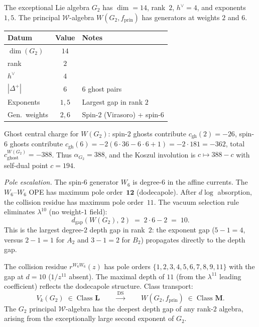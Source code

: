 \begin{computation}
\label{comp:wG2-ds-data}
%
%
The exceptional Lie algebra $G_2$ has $\dim = 14$, rank~$2$,
$h^\vee = 4$, and exponents $1, 5$. The principal
$\mathcal{W}$-algebra $W(G_2, f_{\mathrm{prin}})$ has
generators at weights $2$ and $6$.

\begin{center}
\small
\renewcommand{\arraystretch}{1.3}
\begin{tabular}{lcl}
\toprule
\textbf{Datum} & \textbf{Value} & \textbf{Notes} \\
\midrule
$\dim(G_2)$ & $14$ & \\
rank & $2$ & \\
$h^\vee$ & $4$ & \\
$|\Delta^+|$ & $6$ & $6$ ghost pairs \\
Exponents & $1, 5$ & Largest gap in rank $2$ \\
Gen.\ weights & $2, 6$ & Spin-$2$ (Virasoro) + spin-$6$ \\
\bottomrule
\end{tabular}
\end{center}

\noindent
Ghost central charge for $W(G_2)$: spin-$2$ ghosts contribute
$c_{\mathrm{gh}}(2) = -26$, spin-$6$ ghosts contribute
$c_{\mathrm{gh}}(6) = -2(6 \cdot 36 - 6 \cdot 6 + 1)
= -2 \cdot 181 = -362$, total
$c_{\mathrm{ghost}}^{W(G_2)} = -388$. Thus
$\alpha_{G_2} = 388$, and the Koszul involution is
$c \mapsto 388 - c$ with self-dual point $c = 194$.

\emph{Pole escalation.}
The spin-$6$ generator $W_6$ is degree-$6$ in the affine
currents. The $W_6$--$W_6$ OPE has maximum pole
order~$\mathbf{12}$ (dodecapole). After $d\log$ absorption,
the collision residue has maximum pole order~$11$. The vacuum
selection rule eliminates $\lambda^{10}$ (no weight-$1$ field):
\begin{equation}
\label{eq:wG2-depth-gap}
d_{\mathrm{gap}}(W(G_2),\, 2) \;=\; 2 \cdot 6 - 2 \;=\; 10.
\end{equation}
This is the largest degree-$2$ depth gap in rank~$2$: the
exponent gap ($5 - 1 = 4$, versus $2 - 1 = 1$ for $A_2$ and
$3 - 1 = 2$ for $B_2$) propagates directly to the depth gap.

The collision residue $r^{W_6 W_6}(z)$ has pole orders
$\{1, 2, 3, 4, 5, 6, 7, 8, 9, 11\}$ with the gap at
$d = 10$ ($1/z^{11}$ absent). The maximal depth of $11$
(from the $\lambda^{11}$ leading coefficient) reflects the
dodecapole structure. Class transport:
\[
V_k(G_2) \;\in\; \text{Class } \mathbf{L}
\qquad\xrightarrow{\;\mathrm{DS}\;}\qquad
W(G_2, f_{\mathrm{prin}}) \;\in\; \text{Class } \mathbf{M}.
\]
The $G_2$ principal $\mathcal{W}$-algebra has the deepest depth
gap of any rank-$2$ algebra, arising from the exceptionally large
second exponent of $G_2$.
\end{computation}

